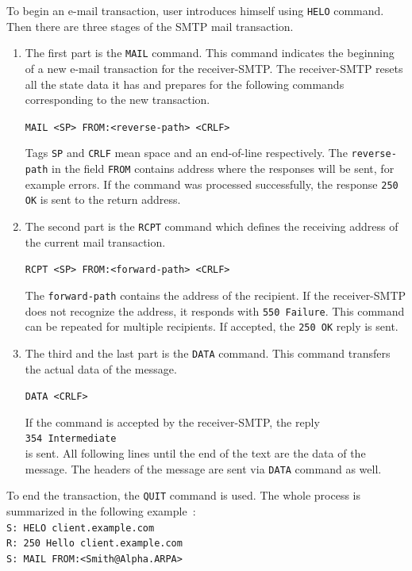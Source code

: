 To begin an e-mail transaction, user introduces himself using \texttt{HELO} command. Then there are three stages of the SMTP mail transaction.
\begin{enumerate}
\item The first part is the \texttt{MAIL} command. This command indicates the beginning of a new e-mail transaction for the receiver-SMTP. The receiver-SMTP resets all the state data it has and prepares for the following commands corresponding to the new transaction.
\begin{center}
\texttt{MAIL <SP> FROM:<reverse-path> <CRLF>}
\end{center}
Tags \texttt{SP} and \texttt{CRLF} mean space and an end-of-line respectively. The \texttt{reverse-path} in the field \texttt{FROM} contains address where the responses will be sent, for example errors. If the command was processed successfully, the response \texttt{250 OK} is sent to the return address.
\item The second part is the \texttt{RCPT} command which defines the receiving address of the current mail transaction. 
\begin{center}
\texttt{RCPT <SP> FROM:<forward-path> <CRLF>}
\end{center}
The \texttt{forward-path} contains the address of the recipient. If the receiver-SMTP does not recognize the address, it responds with \texttt{550 Failure}. This command can be repeated for multiple recipients. If accepted, the \texttt{250 OK} reply is sent.
\item The third and the last part is the \texttt{DATA} command. This command transfers the actual data of the message.
\begin{center}
\texttt{DATA <CRLF>}
\end{center}
If the command is accepted by the receiver-SMTP, the reply \\ \texttt{354 Intermediate} \\ is sent. All following lines until the end of the text are the data of the message. The headers of the message are sent via \texttt{DATA} command as well.
\end{enumerate}
To end the transaction, the \texttt{QUIT} command is used.
The whole process is summarized in the following example~\cite{rfc821}:
\\
\texttt{S: HELO client.example.com}\\
\texttt{R: 250 Hello client.example.com}\\
\texttt{S: MAIL FROM:<Smith@Alpha.ARPA>}\\
